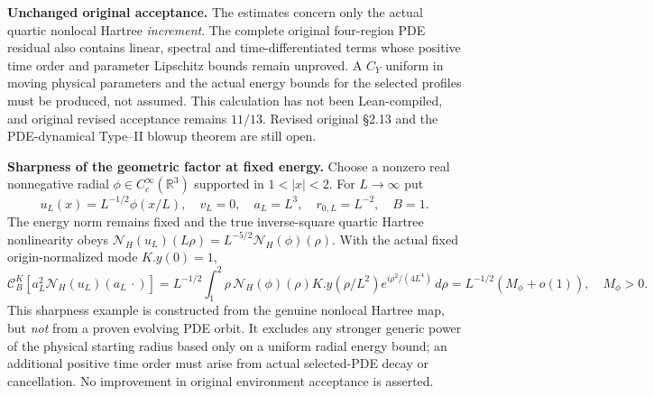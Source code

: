 \medskip
\noindent\textbf{Unchanged original acceptance.}
The estimates concern only the actual quartic nonlocal Hartree
\emph{increment}. The complete original four-region PDE residual also
contains linear, spectral and time-differentiated terms whose
positive time order and parameter Lipschitz bounds remain unproved.
A $C_Y$ uniform in moving physical parameters and the actual energy
bounds for the selected profiles must be produced, not assumed.
This calculation has not been Lean-compiled, and original revised
acceptance remains $11/13$. Revised original \S2.13 and the
PDE-dynamical Type--II blowup theorem are still open.


\medskip
\noindent\textbf{Sharpness of the geometric factor at fixed energy.}
Choose a nonzero real nonnegative radial
$\phi\in C_c^\infty(\mathbb R^3)$ supported in $1<|x|<2$.
For $L\to\infty$ put
\[
 u_L(x)=L^{-1/2}\phi(x/L),\quad v_L=0,\quad
 a_L=L^3,\quad r_{0,L}=L^{-2},\quad B=1.
\]
The energy norm remains fixed and the true inverse-square
quartic Hartree nonlinearity obeys
$\mathcal N_H(u_L)(L\rho)=L^{-5/2}\mathcal N_H(\phi)(\rho)$.
With the actual fixed origin-normalized mode $K.y(0)=1$,
\[
 \mathcal C_B^K[a_L^2\mathcal N_H(u_L)(a_L\,\cdot)]
 =L^{-1/2}\int_1^2 \rho\,\mathcal N_H(\phi)(\rho)
 K.y(\rho/L^2)e^{i\rho^2/(4L^4)}\,d\rho
 =L^{-1/2}(M_\phi+o(1)),\quad M_\phi>0.
\]
This sharpness example is constructed from the genuine nonlocal
Hartree map, but \emph{not} from a proven evolving PDE orbit.
It excludes any stronger generic power of the physical starting
radius based only on a uniform radial energy bound; an additional
positive time order must arise from actual selected-PDE decay or
cancellation. No improvement in original environment acceptance is
asserted.

